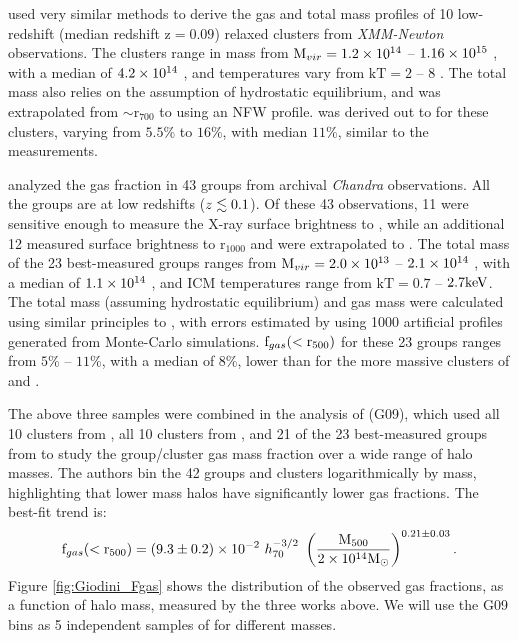 \textbf{\citet{Arnaud2007}} used very similar methods to derive the
gas and total mass profiles of 10 low-redshift (median redshift z$ =
0.09$) relaxed clusters from \textit{XMM-Newton} observations. The
clusters range in mass from $\textrm{M\ensuremath{_{vir}}} = 1.2\times 10^{14}$ -- $1.16 \times 10^{15}$ \Msun,
with a median of $4.2 \times 10^{14}$ \Msun, and temperatures vary from
$\textrm{kT} = 2$ -- $8$ \keV. The total mass also relies on
the assumption of hydrostatic equilibrium, and was extrapolated from
$\sim$r$_{700}$ to \rfive{} using an NFW profile.  \fg{} was derived
out to \rfive{} for these clusters, varying from $5.5\%$ to $16\%$,
with median $11\%$, similar to the \citet{Vikhlinin2006} measurements.

\textbf{\citet{Sun2009}} analyzed the gas fraction in 43 groups from
archival \textit{Chandra} observations. All the groups are at low
redshifts ($z \lesssim 0.1$). Of these 43 observations, 11 were sensitive
enough to measure the X-ray surface brightness to \rfive{}, while an
additional 12 measured surface brightness to r$_{1000}$ and were
extrapolated to \rfive{}. The total mass of the 23 best-measured
groups ranges from $\textrm{M\ensuremath{_{vir}}} = 2.0\times 10^{13}$ -- $2.1 \times 10^{14}$ \Msun, with a
median of $1.1 \times 10^{14}$ \Msun, and ICM temperatures range from
$\textrm{kT} = 0.7$ -- $2.7 \textrm{keV}$. The total mass (assuming hydrostatic
equilibrium) and gas mass were calculated using similar principles to
\citet{Vikhlinin2006}, with errors estimated by using 1000 artificial
profiles generated from Monte-Carlo simulations. $\textrm{f\ensuremath{_{gas}}}(<\textrm{r\ensuremath{_{500}}})$ for
these 23 groups ranges from $5\%$ -- $11\%$, with a median of $8\%$,
lower than for the more massive clusters of \citet{Vikhlinin2006} and
\citet{Arnaud2007}.

The above three samples were combined in the analysis of
\textbf{\citet{Giodini2009}} (G09), which used all 10 clusters from
\citet{Vikhlinin2006}, all 10 clusters from \citet{Arnaud2007}, and 21
of the 23 best-measured groups from \citet{Sun2009} to study the
group/cluster gas mass fraction over a wide range of halo masses. The
authors bin the 42 groups and clusters logarithmically by mass,
highlighting that lower mass halos have significantly lower gas
fractions. The best-fit trend is:
\begin{equation}
\textrm{f\ensuremath{_{gas}}}(<\textrm{r\ensuremath{_{500}}}) = (9.3 \pm 0.2)\times 10^{-2}~h_{70}^{-3/2}~
\left(\frac{\textrm{M\ensuremath{_{500}}}}{2\times 10^{14}\textrm{M}_\odot}\right)^{0.21 \pm 0.03}.
\end{equation}
Figure \ref{fig:Giodini_Fgas} shows the distribution of the observed
gas fractions, as a function of halo mass, measured by the three works
above. We will use the G09 bins as 5 independent samples of \fg{} for
different masses. 

